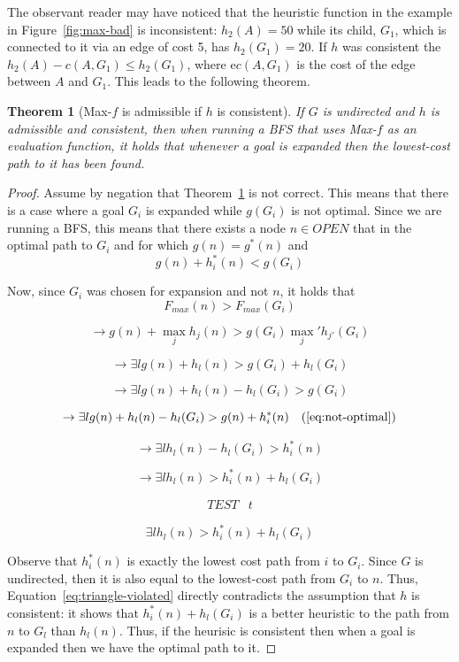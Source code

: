 \documentclass{aicom2e}
\newtheorem{theorem}{Theorem}
\begin{document}
 
 
 The observant reader may have noticed that the heuristic function in the example in Figure~\ref{fig:max-bad} is inconsistent: $h_2(A)=50$ while its child, $G_1$, which is connected to it via an edge of cost 5, has $h_2(G_1)=20$. If $h$ was consistent the $h_2(A)-c(A,G_1)\leq h_2(G_1)$, where e$c(A,G_1)$ is the cost of the edge between $A$ and $G_1$. This leads to the following theorem.
 
 
\begin{theorem}[Max-$f$ is admissible if $h$ is consistent]
If $G$ is undirected and $h$ is admissible and consistent, 
then when running a BFS that uses Max-$f$ as an evaluation function,
it holds that whenever a goal is expanded then the lowest-cost path to it has been found. 
\label{the:max-f}
\end{theorem}
 \begin{proof}
 Assume by negation that Theorem~\ref{the:max-f} is not correct. This means
 that there is a case where a goal $G_i$ is expanded while $g(G_i)$ is not optimal. 
 Since we are running a BFS, this means that there exists a node $n\in OPEN$ that
 in the optimal path to $G_i$ and for which $g(n)=g^*(n)$ and 
 \begin{equation}
     g(n)+h_i^*(n) < g(G_i)
    \label{eq:not-optimal}
 \end{equation}
 
 Now, since $G_i$ was chosen for expansion and not $n$, it holds that 
\[                F_{max}(n)                     > F_{max}(G_i) \] 

 \[ \rightarrow    g(n)+\max_j h_j(n)              > g(G_i) \max_j' h_{j'}(G_i) \]
 
 \[ \rightarrow \exists l   g(n)+h_l(n)            > g(G_i)+h_l(G_i) \]
 
 \[ \rightarrow \exists l   g(n)+h_l(n)-h_l(G_i)   > g(G_i) \]
 
 
 \[ \rightarrow \exists l   g(n)+h_l(n)-h_l(G_i)   > g(n)+h^*_i(n) ~~~ (\ref{eq:not-optimal})\]
 
\[ \rightarrow \exists l   h_l(n)-h_l(G_i)   > h^*_i(n) \]

\[ \rightarrow \exists l   h_l(n)   > h^*_i(n)+h_l(G_i) \]


\begin{align}
TEST & t 
\end{align}

 \begin{equation}
     \exists l   h_l(n)   > h^*_i(n)+h_l(G_i)
    \label{eq:triangle-violated}
 \end{equation}

Observe that $h^*_i(n)$ is exactly the lowest cost path from $i$ to $G_i$. 
Since $G$ is undirected, then it is also equal to the lowest-cost path from $G_i$ 
to $n$. Thus, Equation~\ref{eq:triangle-violated} directly contradicts the assumption
that $h$ is consistent: it shows that $h^*_i(n)+h_l(G_i)$ is a better heuristic 
to the path from $n$ to $G_l$ than $h_l(n)$. Thus, if the heurisic is consistent
then when a goal is expanded then we have the optimal path to it. 
 \end{proof} 
\end{document}
